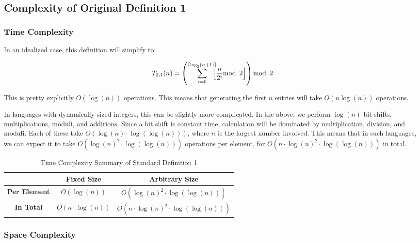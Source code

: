 \documentclass[conference]{IEEEtran}
\begin{document}
\subsection{Complexity of Original Definition 1}
\label{ca:p2_d01}

\subsubsection{Time Complexity}

In an idealized case, this definition will simplify to:

\begin{equation}
T_{2,1}(n) = \left(\sum_{i=0}^{\ceil{\log_2(n + 1)}} \hspace{-8pt} \floor{\dfrac{n}{2^i} \mod{2}} \right) \mod{2}
\end{equation}

This is pretty explicitly $O(\log(n))$ operations. This means that generating the first $n$ entries will take $O(n\log(n))$ operations.

In languages with dynamically sized integers, this can be slightly more complicated. In the above, we perform $\log(n)$ bit shifts, multiplications, moduli, and additions. Since a bit shift is constant time, calculation will be dominated by multiplication, division, and moduli. Each of these take $O(\log(n) \cdot \log(\log(n)))$, where $n$ is the largest number involved. This means that in such languages, we can expect it to take $O(\log(n)^2 \cdot \log(\log(n)))$ operations per element, for $O(n \cdot \log(n)^2 \cdot \log(\log(n)))$ in total.

\renewcommand{\arraystretch}{1.25}
\begin{table}[H]
    \centering
    \caption{Time Complexity Summary of Standard Definition 1}
    \begin{tabular}{|c|c|c|}
        \hline
        & \textbf{Fixed Size} & \textbf{Arbitrary Size} \\
        \hline
        \textbf{Per Element} & $O(\log(n))$ & $O(\log(n)^2 \cdot \log(\log(n)))$ \\
        \hline
        \textbf{In Total} & $O(n \cdot \log(n))$ & $O(n \cdot \log(n)^2 \cdot \log(\log(n)))$ \\
        \hline
    \end{tabular}
    \label{tab:time_p2_d01}
\end{table}
\renewcommand{\arraystretch}{1}

\subsubsection{Space Complexity}
\end{document}
